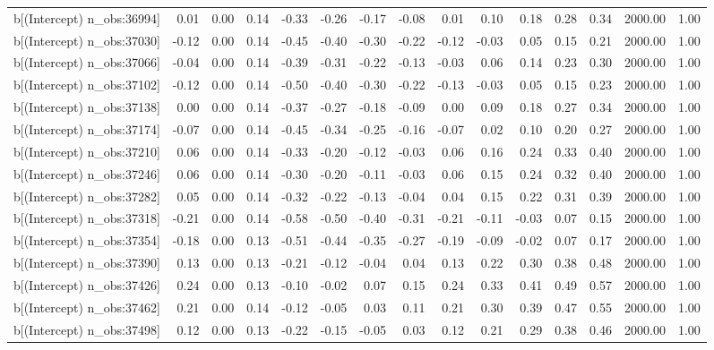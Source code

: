 \begin{table}[ht]
\begin{tabular}{rrrrrrrrrrrrrrr}
  b[(Intercept) n\_obs:36994] & 0.01 & 0.00 & 0.14 & -0.33 & -0.26 & -0.17 & -0.08 & 0.01 & 0.10 & 0.18 & 0.28 & 0.34 & 2000.00 & 1.00 \\ 
  b[(Intercept) n\_obs:37030] & -0.12 & 0.00 & 0.14 & -0.45 & -0.40 & -0.30 & -0.22 & -0.12 & -0.03 & 0.05 & 0.15 & 0.21 & 2000.00 & 1.00 \\ 
  b[(Intercept) n\_obs:37066] & -0.04 & 0.00 & 0.14 & -0.39 & -0.31 & -0.22 & -0.13 & -0.03 & 0.06 & 0.14 & 0.23 & 0.30 & 2000.00 & 1.00 \\ 
  b[(Intercept) n\_obs:37102] & -0.12 & 0.00 & 0.14 & -0.50 & -0.40 & -0.30 & -0.22 & -0.13 & -0.03 & 0.05 & 0.15 & 0.23 & 2000.00 & 1.00 \\ 
  b[(Intercept) n\_obs:37138] & 0.00 & 0.00 & 0.14 & -0.37 & -0.27 & -0.18 & -0.09 & 0.00 & 0.09 & 0.18 & 0.27 & 0.34 & 2000.00 & 1.00 \\ 
  b[(Intercept) n\_obs:37174] & -0.07 & 0.00 & 0.14 & -0.45 & -0.34 & -0.25 & -0.16 & -0.07 & 0.02 & 0.10 & 0.20 & 0.27 & 2000.00 & 1.00 \\ 
  b[(Intercept) n\_obs:37210] & 0.06 & 0.00 & 0.14 & -0.33 & -0.20 & -0.12 & -0.03 & 0.06 & 0.16 & 0.24 & 0.33 & 0.40 & 2000.00 & 1.00 \\ 
  b[(Intercept) n\_obs:37246] & 0.06 & 0.00 & 0.14 & -0.30 & -0.20 & -0.11 & -0.03 & 0.06 & 0.15 & 0.24 & 0.32 & 0.40 & 2000.00 & 1.00 \\ 
  b[(Intercept) n\_obs:37282] & 0.05 & 0.00 & 0.14 & -0.32 & -0.22 & -0.13 & -0.04 & 0.04 & 0.15 & 0.22 & 0.31 & 0.39 & 2000.00 & 1.00 \\ 
  b[(Intercept) n\_obs:37318] & -0.21 & 0.00 & 0.14 & -0.58 & -0.50 & -0.40 & -0.31 & -0.21 & -0.11 & -0.03 & 0.07 & 0.15 & 2000.00 & 1.00 \\ 
  b[(Intercept) n\_obs:37354] & -0.18 & 0.00 & 0.13 & -0.51 & -0.44 & -0.35 & -0.27 & -0.19 & -0.09 & -0.02 & 0.07 & 0.17 & 2000.00 & 1.00 \\ 
  b[(Intercept) n\_obs:37390] & 0.13 & 0.00 & 0.13 & -0.21 & -0.12 & -0.04 & 0.04 & 0.13 & 0.22 & 0.30 & 0.38 & 0.48 & 2000.00 & 1.00 \\ 
  b[(Intercept) n\_obs:37426] & 0.24 & 0.00 & 0.13 & -0.10 & -0.02 & 0.07 & 0.15 & 0.24 & 0.33 & 0.41 & 0.49 & 0.57 & 2000.00 & 1.00 \\ 
  b[(Intercept) n\_obs:37462] & 0.21 & 0.00 & 0.14 & -0.12 & -0.05 & 0.03 & 0.11 & 0.21 & 0.30 & 0.39 & 0.47 & 0.55 & 2000.00 & 1.00 \\ 
  b[(Intercept) n\_obs:37498] & 0.12 & 0.00 & 0.13 & -0.22 & -0.15 & -0.05 & 0.03 & 0.12 & 0.21 & 0.29 & 0.38 & 0.46 & 2000.00 & 1.00 \\ 

\end{tabular}
\end{table}
